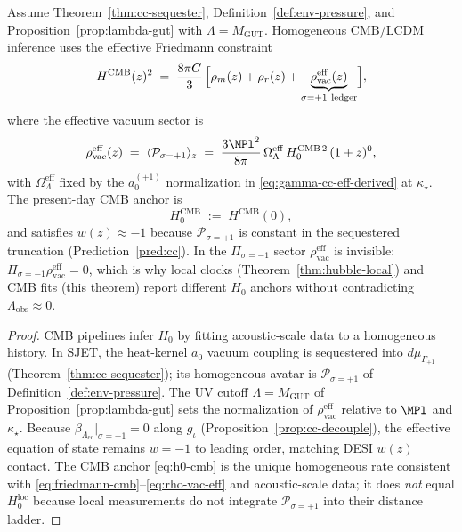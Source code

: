 \begin{theorem}
\label{thm:hubble-cmb}
Assume Theorem~\ref{thm:cc-sequester}, Definition~\ref{def:env-pressure},
and Proposition~\ref{prop:lambda-gut} with $\Lambda=M_{\mathrm{GUT}}$.
Homogeneous CMB/LCDM inference uses the effective Friedmann constraint
\begin{equation}\label{eq:friedmann-cmb}
  H^{\mathrm{CMB}}(z)^2
  \;=\;
  \frac{8\pi G}{3}\,
  \Bigl[
    \rho_m(z)+\rho_r(z)
    +\underbrace{\rho_{\mathrm{vac}}^{\mathrm{eff}}(z)}_{\sigma=+1\ \text{ledger}}
  \Bigr],
\end{equation}
where the effective vacuum sector is
\begin{equation}\label{eq:rho-vac-eff}
  \rho_{\mathrm{vac}}^{\mathrm{eff}}(z)
  \;=\;
  \langle\mathcal{P}_{\sigma=+1}\rangle_z
  \;=\;
  \frac{3\MPl^2}{8\pi}\,
  \Omega_\Lambda^{\mathrm{eff}}\,H_0^{\mathrm{CMB}\,2}\,(1+z)^0,
\end{equation}
with $\Omega_\Lambda^{\mathrm{eff}}$ fixed by the $a_0^{(+1)}$ normalization
in \eqref{eq:gamma-cc-eff-derived} at $\kappa_\star$. The present-day CMB
anchor is
\begin{equation}\label{eq:h0-cmb}
  H_0^{\mathrm{CMB}}
  \;:=\;
  H^{\mathrm{CMB}}(0),
\end{equation}
and satisfies $w(z)\approx -1$ because $\mathcal{P}_{\sigma=+1}$ is constant
in the sequestered truncation (Prediction~\ref{pred:cc}). In the
$\Pi_{\sigma=-1}$ sector $\rho_{\mathrm{vac}}^{\mathrm{eff}}$ is invisible:
$\Pi_{\sigma=-1}\rho_{\mathrm{vac}}^{\mathrm{eff}}=0$, which is why local
clocks (Theorem~\ref{thm:hubble-local}) and CMB fits (this theorem) report
different $H_0$ anchors without contradicting $\Lambda_{\mathrm{obs}}\approx 0$.
\end{theorem}

\begin{proof}
CMB pipelines infer $H_0$ by fitting acoustic-scale data to a homogeneous
history. In SJET, the heat-kernel $a_0$ vacuum coupling is sequestered into
$d\mu_{\Gamma_{+1}}$ (Theorem~\ref{thm:cc-sequester}); its homogeneous avatar
is $\mathcal{P}_{\sigma=+1}$ of Definition~\ref{def:env-pressure}. The UV
cutoff $\Lambda=M_{\mathrm{GUT}}$ of Proposition~\ref{prop:lambda-gut} sets
the normalization of $\rho_{\mathrm{vac}}^{\mathrm{eff}}$ relative to
$\MPl$ and $\kappa_\star$. Because
$\beta_{\Lambda_{\mathrm{cc}}}|_{\sigma=-1}=0$ along $g_\iota$
(Proposition~\ref{prop:cc-decouple}), the effective equation of state
remains $w=-1$ to leading order, matching DESI $w(z)$ contact. The CMB anchor
\eqref{eq:h0-cmb} is the unique homogeneous rate consistent with
\eqref{eq:friedmann-cmb}--\eqref{eq:rho-vac-eff} and acoustic-scale data;
it does \emph{not} equal $H_0^{\mathrm{loc}}$ because local measurements do
not integrate $\mathcal{P}_{\sigma=+1}$ into their distance ladder.
\end{proof}

